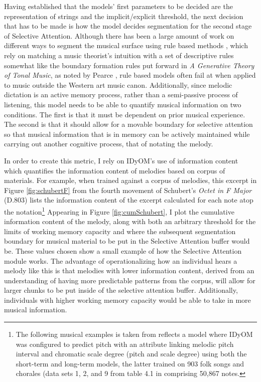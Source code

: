 \documentclass[]{book}
\let\rmarkdownfootnote\footnote%
\def\footnote{\protect\rmarkdownfootnote}
\begin{document}
Having established that the models' first parameters to be decided are the representation of strings and the implicit/explicit threshold, the next decision that has to be made is how the model decides segmentation for the second stage of Selective Attention.
Although there has been a large amount of work on different ways to segment the musical surface using rule based methods \citep{lerdahlGenerativeTheoryTonal1986, margulisModelMelodicExpectation2005, narmourAnalysisCognitionBasic1990, narmourAnalysisCognitionMelodic1992}, which rely on matching a music theorist's intuition with a set of descriptive rules somewhat like the boundary formation rules put forward in \emph{A Generative Theory of Tonal Music}, as noted by Pearce \citep{pearceStatisticalLearningProbabilistic2018a}, rule based models often fail at when applied to music outside the Western art music canon.
Additionally, since melodic dictation is an active memory process, rather than a semi-passive process of listening, this model needs to be able to quantify musical information on two conditions.
The first is that it must be dependent on prior musical experience.
The second is that it should allow for a movable boundary for selective attention so that musical information that is in memory can be actively maintained while carrying out another cognitive process, that of notating the melody.

In order to create this metric, I rely on IDyOM's use of information content \citep{shannonMathematicalTheoryCommunication1948} which quantifies the information content of melodies based on corpus of materials.
For example, when trained against a corpus of melodies, this excerpt in Figure \ref{fig:schubertF} from the fourth movement of Schubert's \emph{Octet in F Major} (D.803) lists the information content of the excerpt calculated for each note atop the notation\footnote{The following musical examples is taken from \citet{pearceStatisticalLearningProbabilistic2018a} reflects a model where IDyOM was configured to predict pitch with an attribute linking melodic pitch interval and chromatic scale degree (pitch and scale degree) using both the short-term and long-term models, the latter trained on 903 folk songs and chorales (data sets 1, 2, and 9 from table 4.1 in \citep{schaffrathEssenFolkSong1995} comprising 50,867 notes.}
Appearing in Figure \ref{fig:cumSchubert}, I plot the cumulative information content of the melody, along with both an arbitrary threshold for the limits of working memory capacity and where the subsequent segmentation boundary for musical material to be put in the Selective Attention buffer would be.
These values chosen show a small example of how the Selective Attention module works.
The advantage of operationalizing how an individual hears a melody like this is that melodies with lower information content, derived from an understanding of having more predictable patterns from the corpus, will allow for larger chunks to be put inside of the selective attention buffer.
Additionally, individuals with higher working memory capacity would be able to take in more musical information.
\end{document}
